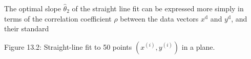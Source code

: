 The optimal slope \(\hat{\theta}_{2}\) of the straight line fit can be expressed more simply in terms of the correlation coefficient \(\rho\) between the data vectors \(x^{\mathrm{d}}\) and \(y^{\mathrm{d}}\), and their standard

Figure 13.2: Straight-line fit to 50 points \((x^{(i)},y^{(i)})\) in a plane.

 